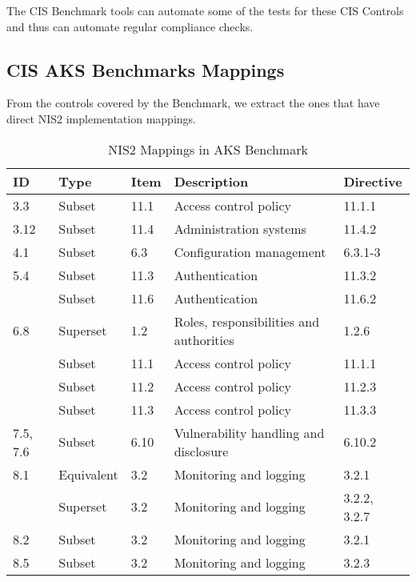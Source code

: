 \pagebreak

The CIS Benchmark tools can automate some of the tests for these CIS Controls and thus can automate regular compliance checks.

\subsection{CIS AKS Benchmarks Mappings}

From the controls covered by the Benchmark, we extract the ones that have direct NIS2 implementation mappings.

\begin{table}[ht]
  \caption{NIS2 Mappings in AKS Benchmark}
    \begin{tabular}{| l | l | l | l | l |}
    \hline
    ID & Type & Item & Description & Directive \\
    \hline\hline
    3.3 & Subset & 11.1 & Access control policy & 11.1.1 \\
    \hline
    3.12 & Subset & 11.4 & Administration systems & 11.4.2 \\
    \hline
    4.1 & Subset & 6.3 & Configuration management & 6.3.1-3 \\
    \hline
    5.4 & Subset & 11.3 & Authentication & 11.3.2 \\
    \hline
    & Subset & 11.6 & Authentication & 11.6.2 \\
    \hline
    6.8 & Superset & 1.2 & Roles, responsibilities and authorities & 1.2.6 \\
    \hline
    & Subset & 11.1 & Access control policy & 11.1.1 \\
    \hline
    & Subset & 11.2 & Access control policy & 11.2.3 \\
    \hline
    & Subset & 11.3 & Access control policy & 11.3.3 \\
    \hline
    7.5, 7.6 & Subset & 6.10 & Vulnerability handling and disclosure & 6.10.2 \\
    \hline
    8.1 & Equivalent & 3.2 & Monitoring and logging & 3.2.1 \\
    \hline
    & Superset & 3.2 & Monitoring and logging & 3.2.2, 3.2.7 \\
    \hline
    8.2 & Subset & 3.2 & Monitoring and logging & 3.2.1 \\
    \hline
    8.5 & Subset & 3.2 & Monitoring and logging & 3.2.3 \\
    \hline
    \end{tabular}%
  \label{tab:aksMapping}%
\end{table}%

